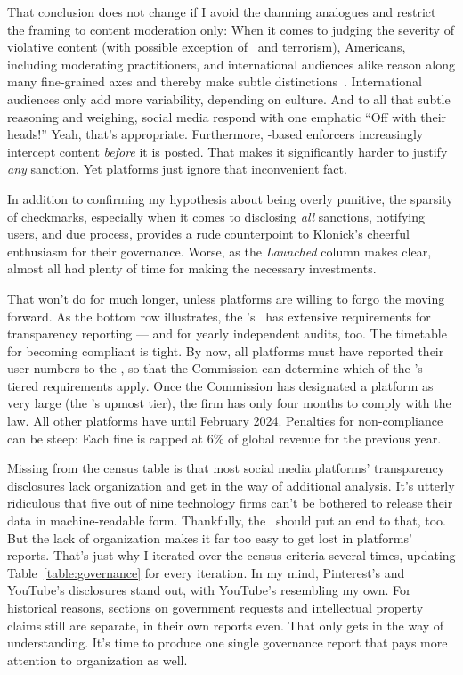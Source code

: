 That conclusion does not change if I avoid the damning analogues and restrict
the framing to content moderation only: When it comes to judging the severity of
violative content (with possible exception of \CSAM\ and terrorism), Americans,
including moderating practitioners, and international audiences alike reason
along many fine-grained axes and thereby make subtle
distinctions~\cite{JiangScheuermanea2021,ScheuermanJiangea2021}. International
audiences only add more variability, depending on culture. And to all that
subtle reasoning and weighing, social media respond with one emphatic ``Off with
their heads!'' Yeah, that's appropriate. Furthermore, \AI{}-based enforcers
increasingly intercept content \emph{before} it is posted. That makes it
significantly harder to justify \emph{any} sanction. Yet platforms just ignore
that inconvenient fact.

In addition to confirming my hypothesis about being overly punitive, the
sparsity of checkmarks, especially when it comes to disclosing \emph{all}
sanctions, notifying users, and due process, provides a rude counterpoint to
Klonick's cheerful enthusiasm for their governance. Worse, as the
\emph{Launched} column makes clear, almost all had plenty of time for making the
necessary investments.

That won't do for much longer, unless platforms are willing to forgo the \EU
moving forward. As the bottom row illustrates, the \EU's \DSA\ has extensive
requirements for transparency reporting --- and for yearly independent audits,
too. The timetable for becoming compliant is tight. By now, all platforms must
have reported their user numbers to the \EU, so that the Commission can
determine which of the \DSA's tiered requirements apply. Once the Commission has
designated a platform as very large (the \DSA's upmost tier), the firm has only
four months to comply with the law. All other platforms have until February
2024. Penalties for non-compliance can be steep: Each fine is capped at 6\% of
global revenue for the previous year.

Missing from the census table is that most social media platforms' transparency
disclosures lack organization and get in the way of additional analysis. It's
utterly ridiculous that five out of nine technology firms can't be bothered to
release their data in machine-readable form. Thankfully, the \DSA\ should put an
end to that, too. But the lack of organization makes it far too easy to get lost
in platforms' reports. That's just why I iterated over the census criteria
several times, updating Table~\ref{table:governance} for every iteration. In my
mind, Pinterest's and YouTube's disclosures stand out, with YouTube's resembling
my own. For historical reasons, sections on government requests and intellectual
property claims still are separate, in their own reports even. That only gets in
the way of understanding. It's time to produce one single governance report that
pays more attention to organization as well.


